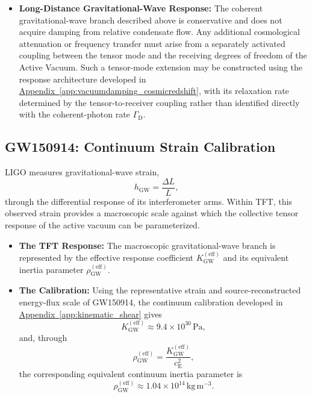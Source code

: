 \begin{itemize}
    \item \textbf{Long-Distance Gravitational-Wave Response:} The coherent gravitational-wave branch described above is conservative and does not acquire damping from relative condensate flow. Any additional cosmological attenuation or frequency transfer must arise from a separately activated coupling between the tensor mode and the receiving degrees of freedom of the Active Vacuum. Such a tensor-mode extension may be constructed using the response architecture developed in \hyperref[app:vacuumdamping_cosmicredshift]{Appendix~\ref*{app:vacuumdamping_cosmicredshift}}, with its relaxation rate determined by the tensor-to-receiver coupling rather than identified directly with the coherent-photon rate $\Gamma_{\mathrm D}$.
\end{itemize}

\subsection{GW150914: Continuum Strain Calibration}
\label{subsec:gw150914_calibration}

LIGO measures gravitational-wave strain,
\begin{equation}
    h_{\mathrm{GW}} = \frac{\Delta L}{L},
\end{equation}
through the differential response of its interferometer arms. Within TFT, this observed strain provides a macroscopic scale against which the collective tensor response of the active vacuum can be parameterized.

\begin{itemize}
    \item \textbf{The TFT Response:} The macroscopic gravitational-wave branch is represented by the effective response coefficient $K_{\mathrm{GW}}^{(\mathrm{eff})}$ and its equivalent inertia parameter $\rho_{\mathrm{GW}}^{(\mathrm{eff})}$.
    
    \item \textbf{The Calibration:} Using the representative strain and source-reconstructed energy-flux scale of GW150914, the continuum calibration developed in \hyperref[app:kinematic_shear]{Appendix~\ref*{app:kinematic_shear}} gives
    \begin{equation}
        K_{\mathrm{GW}}^{(\mathrm{eff})} \approx 9.4 \times 10^{30}\,\mathrm{Pa},
    \end{equation}
    and, through
    \begin{equation}
        \rho_{\mathrm{GW}}^{(\mathrm{eff})} = \frac{K_{\mathrm{GW}}^{(\mathrm{eff})}}{c_{\mathrm{E}}^2},
    \end{equation}
    the corresponding equivalent continuum inertia parameter is
    \begin{equation}
        \rho_{\mathrm{GW}}^{(\mathrm{eff})} \approx 1.04 \times 10^{14}\,\mathrm{kg\,m^{-3}}.
    \end{equation}
\end{itemize}

